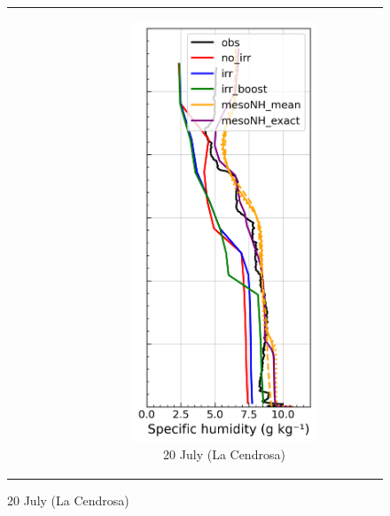 \begin{figure}[hbtp]
{\begin{tabular}{@{}cccc@{}}
\begin{subfigure}[t]{0.285\textwidth}
        \end{subfigure} &
        \begin{subfigure}[t]{0.29\textwidth}
            \caption{20 July (La Cendrosa)}
            \includegraphics[width=\textwidth]{images/chap5/profiles/profile_cendrosa_ovap_2007_sensbins.png}

\end{subfigure}
\end{tabular}}
\end{figure}
